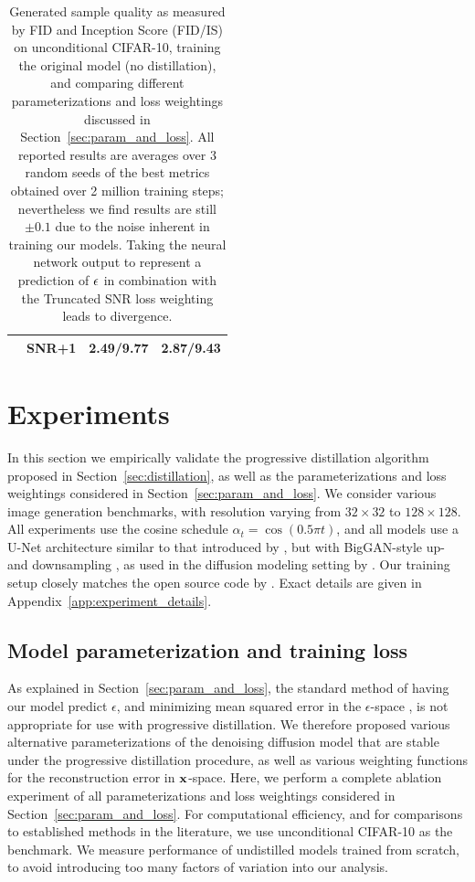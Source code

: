 \documentclass[hidelinks]{article} %
\begin{document}
\begin{table}[hbt]
\begin{center}
\begin{tabular}{cccc}
       & SNR+1                                   & 2.49/9.77           & 2.87/9.43 \\
\bottomrule
\end{tabular}
\end{center}
\caption{Generated sample quality as measured by FID and Inception Score (FID/IS) on unconditional CIFAR-10, training the original model (no distillation), and comparing different parameterizations and loss weightings discussed in Section~\ref{sec:param_and_loss}. All reported results are averages over 3 random seeds of the best metrics obtained over 2 million training steps; nevertheless we find results are still $\pm 0.1$ due to the noise inherent in training our models. Taking the neural network output to represent a prediction of ${\mathbf{\epsilon}}$ in combination with the Truncated SNR loss weighting leads to divergence.}
\label{table:ablations}
\end{table}

\section{Experiments}
\label{sec:experiments}
In this section we empirically validate the progressive distillation algorithm proposed in Section~\ref{sec:distillation}, as well as the parameterizations and loss weightings considered in Section~\ref{sec:param_and_loss}. We consider various image generation benchmarks, with resolution varying from $32\times32$ to $128\times128$. All experiments use the cosine schedule $\alpha_t = \cos(0.5\pi t)$, and all models use a U-Net architecture similar to that introduced by \cite{ho2020denoising}, but with BigGAN-style up- and downsampling \citep{brock2018large}, as used in the diffusion modeling setting by \cite{nichol2021improvedddpm, song2020score}. Our training setup closely matches the open source code by \cite{ho2020denoising}. Exact details are given in Appendix~\ref{app:experiment_details}.

\subsection{Model parameterization and training loss}
\label{sec:ablation}
As explained in Section~\ref{sec:param_and_loss}, the standard method of having our model predict $\epsilon$, and minimizing mean squared error in the $\epsilon$-space \citep{ho2020denoising}, is not appropriate for use with progressive distillation. We therefore proposed various alternative parameterizations of the denoising diffusion model that are stable under the progressive distillation procedure, as well as various weighting functions for the reconstruction error in ${\mathbf{x}}$-space. Here, we perform a complete ablation experiment of all parameterizations and loss weightings considered in Section~\ref{sec:param_and_loss}. For computational efficiency, and for comparisons to established methods in the literature, we use unconditional CIFAR-10 as the benchmark. We measure performance of undistilled models trained from scratch, to avoid introducing too many factors of variation into our analysis.
\end{document}
